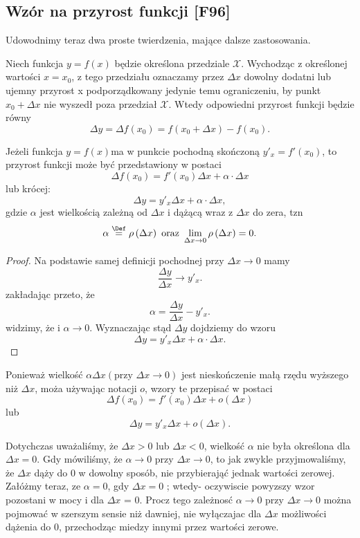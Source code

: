 \subsection{Wzór na przyrost funkcji [F96]} 
Udowodnimy teraz dwa proste twierdzenia, mające dalsze zastosowania.

Niech funkcja $y = f\left( x \right) $ będzie określona przedziale $\mathcal{X}$. Wychodząc z określonej wartości $x=x_0$, z tego przedziału oznaczamy przez $\Delta x$ dowolny dodatni lub ujemny przyrost x podporządkowany jedynie temu ograniczeniu, by punkt $x_0+\Delta x$ nie wyszedł poza przedział $\mathcal{X}$. Wtedy odpowiedni przyrost funkcji będzie równy
\[
\Delta y = \Delta f\left( x_0 \right) = f\left( x_0+\Delta x \right) - f\left( x_0 \right) 
.\] 

\begin{theorem}
	Jeżeli funkcja $y=f\left( x \right) $ma w punkcie pochodną skończoną $y'_{x} = f'\left( x_0 \right) $, to przyrost funkcji może być przedstawiony w postaci
	\[
	\Delta f\left( x_0 \right) = f'\left( x_0 \right) \Delta x + \alpha \cdot \Delta x
	\] 
	lub krócej:
	\[
          \Delta y = y'_{x}\Delta x + \alpha\cdot \Delta x	
	,\] 
gdzie $\alpha$ jest wielkością zależną od $\Delta x$ i dążącą wraz z $\Delta x$ do zera, tzn \[
\alpha \overset{\Def}{=} \rho\left( \Delta x \right) \text{ oraz } \lim_{\Delta x \to 0} \rho\left( \Delta x \right) = 0
.\] 
\end{theorem} 
\begin{proof}
	Na podstawie samej definicji pochodnej przy $\Delta x \to 0$ mamy
	\[
	\frac{\Delta y}{\Delta x}\to y'_{x}
	.\] 
	zakładając przeto, że
	\[
	\alpha = \frac{\Delta y}{\Delta x}-y'_{x}
	.\] 
	widzimy, że i $\alpha\to 0$. Wyznaczając stąd $\Delta y$ dojdziemy do wzoru
	\[	
          \Delta y = y'_{x}\Delta x + \alpha\cdot \Delta x	
	.\] 
\end{proof} 

Ponieważ wielkość $\alpha\Delta x (\text{przy } \Delta x \to 0)$ jest nieskończenie małą rzędu wyższego niż $\Delta x$, moża używając notacji $o$, wzory te przepisać w postaci
\[
	\Delta f\left( x_0 \right) = f'\left( x_0 \right) \Delta x + o\left(\Delta x\right) 
	\] 
	lub
	\[
          \Delta y = y'_{x}\Delta x + o\left(\Delta x\right) 
	.\]

	\begin{remark}
		Dotychczas uważaliśmy, że $\Delta x > 0$ lub $\Delta x < 0$, wielkość $\alpha$ nie była określona dla $\Delta x = 0$. Gdy mówiliśmy, że $\alpha\to 0$ przy $\Delta x \to 0$, to jak zwykle przyjmowaliśmy, że $\Delta x$ dąży do 0 w dowolny sposób, nie przybierająć jednak wartości zerowej. Załóżmy teraz, ze $\alpha = 0$, gdy $\Delta x = 0$ ; wtedy- oczywiscie powyzszy wzor pozostani w mocy i dla $\Delta x$ = 0. Procz tego zależnosć $\alpha\to 0$ przy $\Delta x \to 0$ można pojmować w szerszym sensie niż dawniej, nie wyłączajac dla $\Delta x$ możliwości dążenia do 0, przechodząc miedzy innymi przez wartości zerowe.
	\end{remark} 

